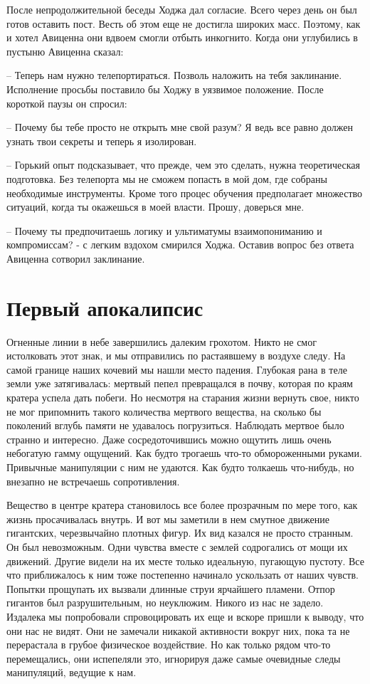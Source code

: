 \documentclass[12pt,a4paper]{article}
\begin{document}
После непродолжительной беседы Ходжа дал согласие. Всего через день он был готов оставить пост. Весть об этом еще не достигла широких масс. Поэтому, как и хотел Авиценна они вдвоем смогли отбыть инкогнито. Когда они углубились в пустыню Авиценна сказал:

-- Теперь нам нужно телепортираться. Позволь наложить на тебя заклинание.
Исполнение просьбы поставило бы Ходжу в уязвимое положение. После короткой паузы он спросил:

-- Почему бы тебе просто не открыть мне свой разум? Я ведь все равно должен узнать твои секреты и теперь я изолирован.

-- Горький опыт подсказывает, что прежде, чем это сделать, нужна теоретическая подготовка. Без телепорта мы не сможем попасть в мой дом, где собраны необходимые инструменты. Кроме того процес обучения предполагает множество ситуаций, когда ты окажешься в моей власти. Прошу, доверься мне.

-- Почему ты предпочитаешь логику и ультиматумы взаимопониманию и компромиссам? - с легким вздохом смирился Ходжа.
Оставив вопрос без ответа Авиценна сотворил заклинание.



\section*{Первый апокалипсис}

Огненные линии в небе завершились далеким грохотом. Никто не смог истолковать этот знак, и мы отправились по растаявшему в воздухе следу. На самой границе наших кочевий мы нашли место падения. Глубокая рана в теле земли уже затягивалась: мертвый пепел превращался в почву, которая по краям кратера успела дать побеги. Но несмотря на старания жизни вернуть свое, никто не мог припомнить такого количества мертвого вещества, на сколько бы поколений вглубь памяти не удавалось погрузиться. Наблюдать мертвое было странно и интересно. Даже сосредоточившись можно ощутить лишь очень небогатую гамму ощущений. Как будто трогаешь что-то обмороженными руками. Привычные манипуляции с ним не удаются. Как будто толкаешь что-нибудь, но внезапно не встречаешь сопротивления.

Вещество в центре кратера становилось все более прозрачным по мере того, как жизнь просачивалась внутрь. И вот мы заметили в нем смутное движение гигантских, черезвычайно плотных фигур. Их вид казался не просто странным. Он был невозможным. Одни чувства вместе с землей содрогались от мощи их движений. Другие видели на их месте только идеальную, пугающую пустоту. Все что приближалось к ним тоже постепенно начинало ускользать от наших чувств. Попытки прощупать их вызвали длинные струи ярчайшего пламени. Отпор гигантов был разрушительным, но неуклюжим. Никого из нас не задело. Издалека мы попробовали спровоцировать их еще и вскоре пришли к выводу, что они нас не видят. Они не замечали никакой активности вокруг них, пока та не перерастала в грубое физическое воздействие. Но как только рядом что-то перемещались, они испепеляли это, игнорируя даже самые очевидные следы манипуляций, ведущие к нам.
\end{document}
